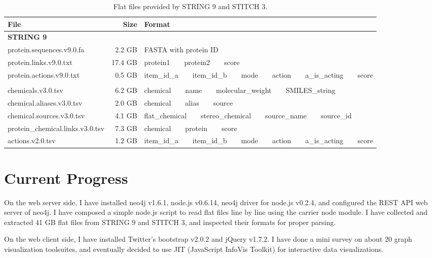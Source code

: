 \documentclass[10pt,conference,compsocconf]{../IEEEtran}
\begin{document}
\begin{table*}
\centering
\begin{tabular*}
{\linewidth}
{@{\extracolsep{\fill}}lrl}
\toprule
File & Size & Format\\
\midrule
\multicolumn{3}{l}{\textbf{STRING 9}}\\
protein.sequences.v9.0.fa &  2.2 GB & FASTA with protein ID\\
protein.links.v9.0.txt    & 17.4 GB & protein1\ \ \ \ protein2\ \ \ \ score\\
protein.actions.v9.0.txt  &  0.5 GB & item\_id\_a\ \ \ \ item\_id\_b\ \ \ \ mode\ \ \ \ action\ \ \ \ a\_is\_acting\ \ \ \ score\\
\noalign{\smallskip\smallskip}
\multicolumn{3}{l}{\textbf{STITCH 3}}\\
chemicals.v3.0.tsv               & 6.2 GB & chemical\ \ \ \ name\ \ \ \ molecular\_weight\ \ \ \ SMILES\_string\\
chemical.aliases.v3.0.tsv        & 2.0 GB & chemical\ \ \ \ alias\ \ \ \ source\\
chemical.sources.v3.0.tsv        & 4.1 GB & flat\_chemical\ \ \ \ stereo\_chemical\ \ \ \ source\_name\ \ \ \ source\_id\\
protein\_chemical.links.v3.0.tsv & 7.3 GB & chemical\ \ \ \ protein\ \ \ \ score\\
actions.v2.0.tsv                 & 1.2 GB & item\_id\_a\ \ \ \ item\_id\_b\ \ \ \ mode\ \ \ \ action\ \ \ \ a\_is\_acting\ \ \ \ score\\
\bottomrule
\end{tabular*}
\caption{Flat files provided by STRING 9 and STITCH 3.}
\label{tab:datasets}
\end{table*}

\section{Current Progress}

On the web server side, I have installed neo4j v1.6.1, node.js v0.6.14, neo4j driver for node.js v0.2.4, and configured the REST API web server of neo4j. I have composed a simple node.js script to read flat files line by line using the carrier node module. I have collected and extracted 41 GB flat files from STRING 9 and STITCH 3, and inspected their formats for proper parsing.

On the web client side, I have installed Twitter's bootstrap v2.0.2 and jQuery v1.7.2. I have done a mini survey on about 20 graph visualization toolsuites, and eventually decided to use JIT (JavaScript InfoVis Toolkit) for interactive data visualizations.
\end{document}
